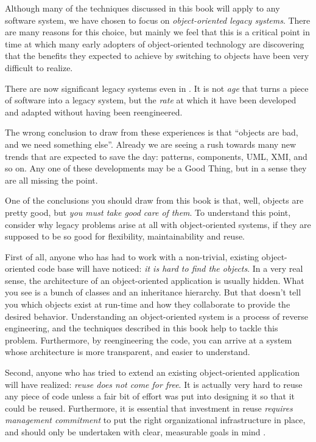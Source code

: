 \documentclass[a4paper,10pt,twoside]{book}
\begin{document}
Although many of the techniques discussed in this book will apply to any software system, we have chosen to focus on \emph{object-oriented legacy systems}. There are many reasons for this choice, but mainly we feel that this is a critical point in time at which many early adopters of object-oriented technology are discovering that the benefits they expected to achieve by switching to objects have been very difficult to realize.

There are now significant legacy systems even in . It is not \emph{age} that turns a piece of software into a legacy system, but the \emph{rate} at which it have been developed and adapted without having been reengineered.

The wrong conclusion to draw from these experiences is that ``objects are bad, and we need something else''. Already we are seeing a rush towards many new trends that are expected to save the day: patterns, components, UML, XMI, and so on. Any one of these developments may be a Good Thing, but in a sense they are all missing the point.

One of the conclusions you should draw from this book is that, well, objects are pretty good, but \emph{you must take good care of them}. To understand this point, consider why legacy problems arise at all with object-oriented systems, if they are supposed to be so good for flexibility, maintainability and reuse.

First of all, anyone who has had to work with a non-trivial, existing object-oriented code base will have noticed: \emph{it is hard to find the objects}. In a very real sense, the architecture of an object-oriented application is usually hidden. What you see is a bunch of classes and an inheritance hierarchy. But that doesn't tell you which objects exist at run-time and how they collaborate to provide the desired behavior. Understanding an object-oriented system is a process of reverse engineering, and the techniques described in this book help to tackle this problem. Furthermore, by reengineering the code, you can arrive at a system whose architecture is more transparent, and easier to understand.

Second, anyone who has tried to extend an existing object-oriented application will have realized: \emph{reuse does not come for free}. It is actually very hard to reuse any piece of code unless a fair bit of effort was put into designing it so that it could be reused. Furthermore, it is essential that investment in reuse \emph{requires management commitment} to put the right organizational infrastructure in place, and should only be undertaken with clear, measurable goals in mind \cite{Gold95a}.
\end{document}
